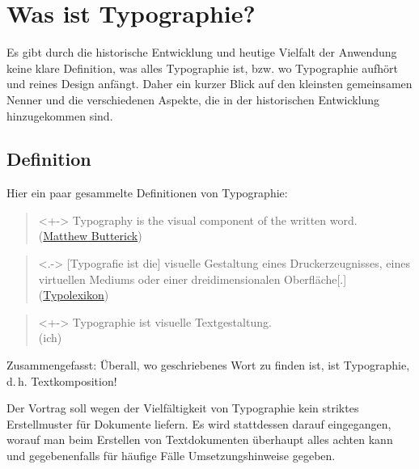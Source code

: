 
\section{Was ist Typographie?}
\frame{\sectionpage}
Es gibt durch die historische Entwicklung und heutige Vielfalt der
Anwendung keine klare Definition, was alles Typographie ist, bzw. wo
Typographie aufhört und reines Design anfängt.
Daher ein kurzer Blick auf den kleinsten gemeinsamen Nenner und die
verschiedenen Aspekte, die in der historischen Entwicklung
hinzugekommen sind.

\subsection{Definition}
Hier ein paar gesammelte Definitionen von Typographie: 
\begin{frame}
  \begin{quote}<+->
    Typography is the visual component of the written word. \\
    (\href{http://practicaltypography.com/}{Matthew Butterick})
  \end{quote}
  \begin{quote}<.->
    [Typografie ist die] visuelle Gestaltung eines Druckerzeugnisses,
    eines virtuellen Mediums oder einer dreidimensionalen Oberfläche[.]\\
    (\href{http://www.typolexikon.de/typographie/}{Typolexikon})
  \end{quote}
  \begin{quote}<+->
    Typographie ist visuelle Textgestaltung.\\
    (ich)
  \end{quote}
\end{frame}
Zusammengefasst: Überall, wo geschriebenes Wort zu finden ist, ist
Typographie, d.\,h. Textkomposition!

Der Vortrag soll wegen der Vielfältigkeit von Typographie kein striktes
Erstellmuster für Dokumente liefern. Es wird stattdessen darauf
eingegangen, worauf man beim Erstellen von Textdokumenten überhaupt alles
achten kann und gegebenenfalls für häufige Fälle Umsetzungshinweise
gegeben.


